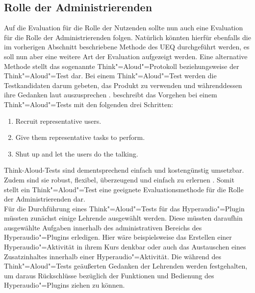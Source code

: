 
\subsection{Rolle der Administrierenden}
Auf die Evaluation für die Rolle der Nutzenden sollte nun auch eine Evaluation für die Rolle der Administrierenden folgen. Natürlich könnten hierfür ebenfalls die im vorherigen Abschnitt beschriebene Methode des UEQ durchgeführt werden, es soll nun aber eine weitere Art der Evaluation aufgezeigt werden. Eine alternative Methode stellt das sogenannte Think"=Aloud"=Protokoll beziehungsweise der Think"=Aloud"=Test dar. Bei einem Think"=Aloud"=Test werden die Testkandidaten darum gebeten, das Produkt zu verwenden und währenddessen ihre Gedanken laut auszusprechen \citep{nielsen2012thinking}. \cite{nielsen2012thinking} beschreibt das Vorgehen bei einem Think"=Aloud"=Tests mit den folgenden drei Schritten:

\begin{enumerate}
\item Recruit representative users.
\item Give them representative tasks to perform.
\item Shut up and let the users do the talking.
\end{enumerate}


Think-Aloud-Tests sind dementsprechend einfach und kostengünstig umsetzbar. Zudem sind sie robust, flexibel, überzeugend und einfach zu erlernen \citep{nielsen2012thinking}. Somit stellt ein Think"=Aloud"=Test eine geeignete Evaluationsmethode für die Rolle der Administrierenden dar.\\
Für die Durchführung eines Think"=Aloud"=Tests für das Hyperaudio"=Plugin müssten zunächst einige Lehrende ausgewählt werden. Diese müssten daraufhin ausgewählte Aufgaben innerhalb des administrativen Bereichs des Hyperaudio"=Plugins erledigen. Hier wäre beispielsweise das Erstellen einer Hyperaudio"=Aktivität in ihrem Kurs denkbar oder auch das Austauschen eines Zusatzinhaltes innerhalb einer Hyperaudio"=Aktivität. Die während des Think"=Aloud"=Tests geäußerten Gedanken der Lehrenden werden festgehalten, um daraus Rückschlüsse bezüglich der Funktionen und Bedienung des Hyperaudio"=Plugins ziehen zu können.




